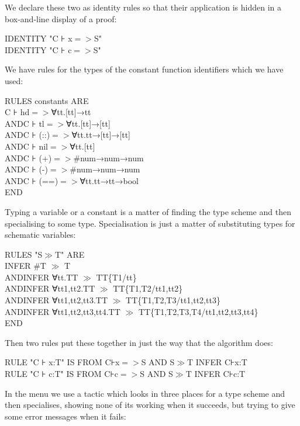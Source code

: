 We declare these two as identity rules so that their application is hidden in a box-and-line display of a proof:

IDENTITY "C ⊦ x$=>$S"\\
IDENTITY "C ⊦ c$=>$S"


We have rules for the types of the constant function identifiers which we have used:

RULES constants ARE\\
\tab C ⊦ hd$=>$∀tt.[tt]→tt\\
AND\tab C ⊦ tl$=>$∀tt.[tt]→[tt]\\
AND\tab C ⊦ (::)$=>$∀tt.tt→[tt]→[tt]\\
AND\tab C ⊦ nil$=>$∀tt.[tt]\\
AND\tab C ⊦ (+)$=>$\#num→num→num\\
AND\tab C ⊦ (-)$=>$\#num→num→num\\
AND\tab C ⊦ (==)$=>$∀tt.tt→tt→bool\\
END


Typing a variable or a constant is a matter of finding the type scheme and then specialising to some type. Specialisation is just a matter of substituting types for schematic variables:

RULES "S$\gg$T" ARE\\
\tab INFER \#T $\gg$ T\\
AND\tab INFER ∀tt.TT $\gg$ TT\{T1/tt\}\\
AND\tab INFER ∀tt1,tt2.TT $\gg$ TT\{T1,T2/tt1,tt2\}\\
AND\tab INFER ∀tt1,tt2,tt3.TT $\gg$ TT\{T1,T2,T3/tt1,tt2,tt3\}\\
AND\tab INFER ∀tt1,tt2,tt3,tt4.TT $\gg$ TT\{T1,T2,T3,T4/tt1,tt2,tt3,tt4\}\\
END


Then two rules put these together in just the way that the algorithm does:

RULE "C ⊦ x:T" IS FROM C⊦x$=>$S AND S$\gg$T INFER C⊦x:T\\
RULE "C ⊦ c:T" IS FROM C⊦c$=>$S AND S$\gg$T INFER C⊦c:T


In the menu we use a tactic which looks in three places for a type scheme and then specialises, showing none of its working when it succeeds, but trying to give some error messages when it fails:

